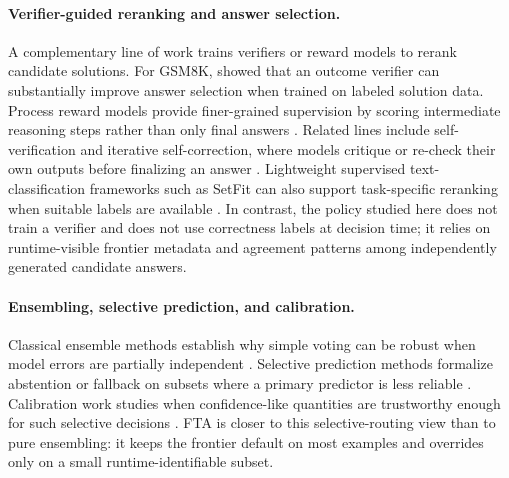\paragraph{Verifier-guided reranking and answer selection.}
A complementary line of work trains verifiers or reward models to rerank candidate solutions.
For GSM8K, \citet{cobbe2021training} showed that an outcome verifier can substantially improve answer selection when trained on labeled solution data.
Process reward models provide finer-grained supervision by scoring intermediate reasoning steps rather than only final answers \citep{lightman2024lets}.
Related lines include self-verification and iterative self-correction, where models critique or re-check their own outputs before finalizing an answer \citep{weng2023largelanguagemodelsbetter,madaan2023selfrefineiterativerefinementselffeedback}.
Lightweight supervised text-classification frameworks such as SetFit can also support task-specific reranking when suitable labels are available \citep{tunstall2022efficient}.
In contrast, the policy studied here does not train a verifier and does not use correctness labels at decision time; it relies on runtime-visible frontier metadata and agreement patterns among independently generated candidate answers.

\paragraph{Ensembling, selective prediction, and calibration.}
Classical ensemble methods establish why simple voting can be robust when model errors are partially independent \citep{dietterich2000ensemble}.
Selective prediction methods formalize abstention or fallback on subsets where a primary predictor is less reliable \citep{geifman2017selectiveclassificationdeepneural}.
Calibration work studies when confidence-like quantities are trustworthy enough for such selective decisions \citep{guo2017calibrationmodernneuralnetworks}.
FTA is closer to this selective-routing view than to pure ensembling: it keeps the frontier default on most examples and overrides only on a small runtime-identifiable subset.

